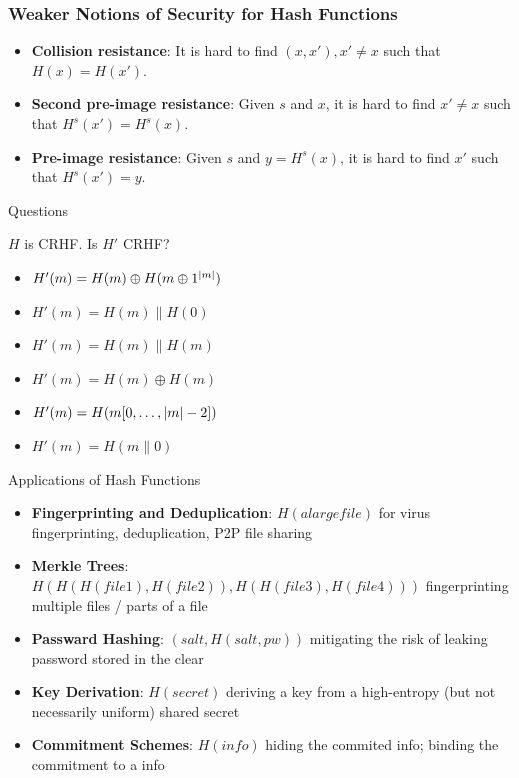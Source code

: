 \begin{frame}\frametitle{Weaker Notions of Security for Hash Functions}
\begin{figure}
\begin{center}

\end{center}
\end{figure}
\begin{itemize}
\item \textbf{Collision resistance}: It is hard to find $(x, x'), x' \ne x$ such that $H(x) = H(x')$.
\item \textbf{Second pre-image resistance}: Given $s$ and $x$, it is hard to find $x' \ne x$ such that $H^s(x') = H^s(x)$.
\item \textbf{Pre-image resistance}: Given $s$ and $y = H^s(x)$, it is hard to find $x'$ such that $H^s(x')=y$.
\end{itemize}
\end{frame}
\begin{frame}{Questions}
\begin{exampleblock}{$H$ is CRHF. Is $H'$ CRHF?}
\begin{itemize}
\item $H'(m) = H(m)\oplus H(m\oplus 1^{\lvert m\rvert})$ %
\item $H'(m) = H(m)\| H(0)$
\item $H'(m) = H(m)\| H(m)$
\item $H'(m) = H(m) \oplus H(m)$
\item $H'(m) = H(m[0,\dots,\lvert m\rvert-2])$
\item $H'(m) = H(m\| 0)$
\end{itemize}
\end{exampleblock}
\end{frame}
\begin{frame}{Applications of Hash Functions}
\begin{itemize}
\item \textbf{Fingerprinting and Deduplication}: $H(alargefile)$ for virus fingerprinting, deduplication, P2P file sharing
\item \textbf{Merkle Trees}: $H(H(H(file1), H(file2)), H(H(file3), H(file4)))$ fingerprinting multiple files / parts of a file
\item \textbf{Passward Hashing}: $(salt, H(salt, pw))$ mitigating the risk of leaking password stored in the clear 
\item \textbf{Key Derivation}: $H(secret)$ deriving a key from a high-entropy (but not necessarily uniform) shared secret
\item \textbf{Commitment Schemes}: $H(info)$ hiding the commited info; binding the commitment to a info
\end{itemize}
\end{frame}
